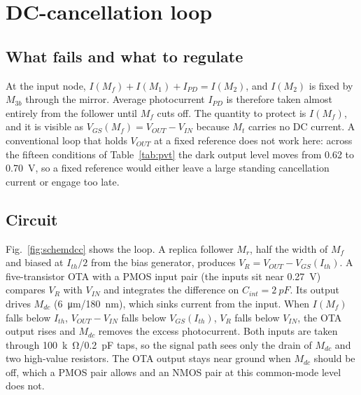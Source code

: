 \documentclass[11pt,a4paper]{article}
\begin{document}
\section{DC-cancellation loop}\label{sec:dcc}
\subsection{What fails and what to regulate}
At the input node, $I(M_f)+I(M_1)+I_{PD}=I(M_2)$, and $I(M_2)$ is fixed by $M_{3b}$ through the mirror. Average photocurrent $I_{PD}$ is therefore taken almost entirely from the follower until $M_f$ cuts off. The quantity to protect is $I(M_f)$, and it is visible as $V_{GS}(M_f)=V_{OUT}-V_{IN}$ because $M_t$ carries no DC current. A conventional loop that holds $V_{OUT}$ at a fixed reference does not work here: across the fifteen conditions of Table~\ref{tab:pvt} the dark output level moves from 0.62 to \SI{0.70}{V}, so a fixed reference would either leave a large standing cancellation current or engage too late.

\subsection{Circuit}
Fig.~\ref{fig:schemdcc} shows the loop. A replica follower $M_r$, half the width of $M_f$ and biased at $I_{th}/2$ from the bias generator, produces $V_R=V_{OUT}-V_{GS}(I_{th})$. A five-transistor OTA with a PMOS input pair (the inputs sit near \SI{0.27}{V}) compares $V_R$ with $V_{IN}$ and integrates the difference on $C_{int}=\SI{2}{pF}$. Its output drives $M_{dc}$ (\SI{6}{\micro m}/\SI{180}{nm}), which sinks current from the input. When $I(M_f)$ falls below $I_{th}$, $V_{OUT}-V_{IN}$ falls below $V_{GS}(I_{th})$, $V_R$ falls below $V_{IN}$, the OTA output rises and $M_{dc}$ removes the excess photocurrent. Both inputs are taken through \SI{100}{k\ohm}/\SI{0.2}{pF} taps, so the signal path sees only the drain of $M_{dc}$ and two high-value resistors. The OTA output stays near ground when $M_{dc}$ should be off, which a PMOS pair allows and an NMOS pair at this common-mode level does not.
\end{document}
